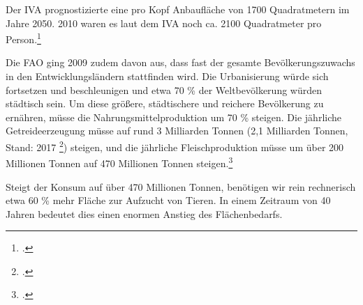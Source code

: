 \documentclass{scrartcl}
\begin{document}
Der IVA prognostizierte eine pro Kopf Anbaufläche von 1700 Quadratmetern im Jahre 2050. 2010 waren es laut dem IVA noch ca. 2100 Quadratmeter pro Person.\footcite[Vgl.]{Agrar0NahrungsmittelLandwirtschaft}

Die FAO ging 2009 zudem davon aus, dass fast der gesamte Bevölkerungszuwachs in den Entwicklungsländern stattfinden wird. Die Urbanisierung würde sich fortsetzen und beschleunigen und etwa 70 \% der Weltbevölkerung würden städtisch sein. Um diese größere, städtischere und reichere Bevölkerung zu ernähren, müsse die Nahrungsmittelproduktion um 70 \% steigen. Die jährliche Getreideerzeugung müsse auf rund 3 Milliarden Tonnen (2,1 Milliarden Tonnen, Stand: 2017 \footcite[Vgl.]{IGC}) steigen, und die jährliche Fleischproduktion müsse um über 200 Millionen Tonnen auf 470 Millionen Tonnen steigen.\footcite[Vgl.][S. 2]{FAO2009How2050}


Steigt der Konsum auf über 470 Millionen Tonnen, benötigen wir rein rechnerisch etwa 60 \% mehr Fläche zur Aufzucht von Tieren. In einem Zeitraum von 40 Jahren bedeutet dies einen enormen Anstieg des Flächenbedarfs.
\end{document}
